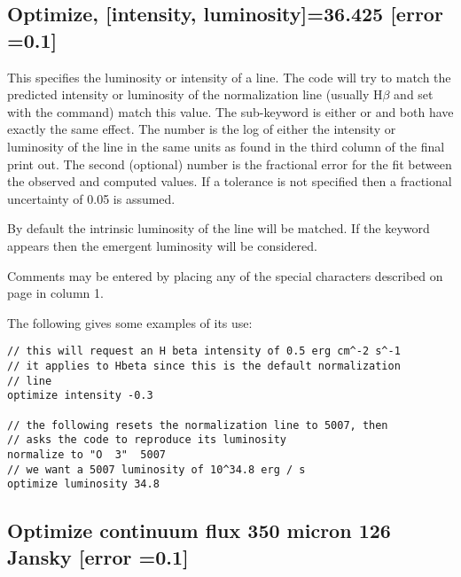 \subsection{Optimize, [intensity, luminosity]=36.425 [error =0.1]}

This specifies the luminosity or intensity of a line.
The code will
try to match the predicted intensity or luminosity of the
normalization line
(usually H$\beta$ and set with the  command)
match this value.
The
sub-keyword is either  or 
and both have exactly the
same effect.
The number is the log of either the intensity or luminosity
of the line in the same units as found in the third column of
the final print out.
The second (optional) number is the fractional error for the
fit between the observed and computed values.
If a tolerance is not
specified then a fractional uncertainty of 0.05 is assumed.

By default the intrinsic luminosity of the line will be matched.
If the keyword  appears then the
emergent luminosity will be considered.

Comments may be entered by placing any of the special characters
described on page \pageref{sec:CommentsInInput} in column 1.

The following gives some examples of its use:
\begin{verbatim}
// this will request an H beta intensity of 0.5 erg cm^-2 s^-1
// it applies to Hbeta since this is the default normalization
// line
optimize intensity -0.3

// the following resets the normalization line to 5007, then
// asks the code to reproduce its luminosity
normalize to "O  3"  5007
// we want a 5007 luminosity of 10^34.8 erg / s
optimize luminosity 34.8
\end{verbatim}

\subsection{Optimize continuum flux 350 micron 126 Jansky [error =0.1]}
\label{sec:opt:cont:flux}


